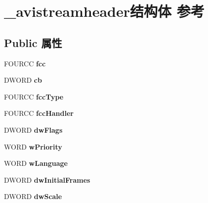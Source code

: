 \hypertarget{struct__avistreamheader}{}\section{\+\_\+avistreamheader结构体 参考}
\label{struct__avistreamheader}
\subsection*{Public 属性}
\begin{DoxyCompactItemize}
\item 
\mbox{\label{struct__avistreamheader_abb1f10654b80b25b8809cfde1a485b75}} 
F\+O\+U\+R\+CC {\bfseries fcc}
\item 
\mbox{\label{struct__avistreamheader_a304e666e0d3e0fd1d1e421e96b3227d4}} 
D\+W\+O\+RD {\bfseries cb}
\item 
\mbox{\label{struct__avistreamheader_a2f18a01bbf4df26df4e3da100cb36ba2}} 
F\+O\+U\+R\+CC {\bfseries fcc\+Type}
\item 
\mbox{\label{struct__avistreamheader_a2ded6d31a1d2cdd6f6f555628b99e62d}} 
F\+O\+U\+R\+CC {\bfseries fcc\+Handler}
\item 
\mbox{\label{struct__avistreamheader_ae9e03c6d44c0089b968e1f72e3381680}} 
D\+W\+O\+RD {\bfseries dw\+Flags}
\item 
\mbox{\label{struct__avistreamheader_ad5aae75265bab685418c6880b24e77a1}} 
W\+O\+RD {\bfseries w\+Priority}
\item 
\mbox{\label{struct__avistreamheader_a819c925338382679dbf6bb951fbb22ed}} 
W\+O\+RD {\bfseries w\+Language}
\item 
\mbox{\label{struct__avistreamheader_a262c015f9daf29c0599a9828767531c8}} 
D\+W\+O\+RD {\bfseries dw\+Initial\+Frames}
\item 
\mbox{\label{struct__avistreamheader_a2558c5e78fe4f70d0463bd15969e82db}} 
D\+W\+O\+RD {\bfseries dw\+Scale}

\end{DoxyCompactItemize}
